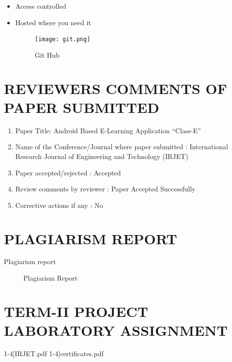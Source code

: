 \documentclass[oneside,a4paper,12pt]{report}
\begin{document}
\begin{appendices}
\begin{itemize}
\begin{itemize}
\begin{itemize}
\item Access controlled

\item Hosted where you need it

\begin{figure}[h]
\centering
\texttt{[image: git.png]}
\caption{Git Hub}
\end{figure}
\end{itemize}
\end{itemize}


\chapter{REVIEWERS COMMENTS OF PAPER SUBMITTED}
\newpage
\begin{enumerate}
\item Paper Title: Android Based E-Learning Application “Class-E”
\item Name of the Conference/Journal where paper submitted : International Research Journal of Engineering and Technology (IRJET)
\item Paper accepted/rejected : Accepted
\item Review comments by reviewer : Paper Accepted Successfully
\item Corrective actions if any : No
\end{enumerate}

\chapter{PLAGIARISM REPORT}
\newpage
Plagiarism report
\begin{center}
	\begin{figure}[!htbp]
		\centering
	  \caption{Plagiarism Report}
	  \label{fig:Plagiarism Report}
	\end{figure}
\end{center} 


\chapter{TERM-II PROJECT LABORATORY ASSIGNMENT}
\newpage
{1-4}]{IRJET.pdf}
\newpage
{1-4}]{certificates.pdf}

\end{itemize}
\end{appendices}
\end{document}
